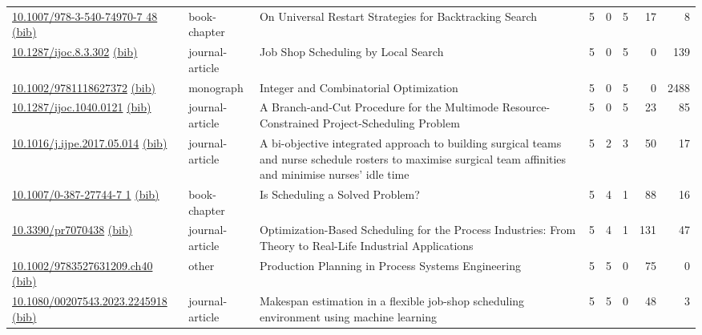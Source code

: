 {\begin{longtable}{p{5cm}lp{11cm}rrrrr}
\href{http://dx.doi.org/10.1007/978-3-540-74970-7_48}{10.1007/978-3-540-74970-7 48} \href{https://www.doi2bib.org/bib/10.1007/978-3-540-74970-7_48}{(bib)} & book-chapter & On Universal Restart Strategies for Backtracking Search & 5 & 0 & 5 & 17 & 8 \\
\href{http://dx.doi.org/10.1287/ijoc.8.3.302}{10.1287/ijoc.8.3.302} \href{https://www.doi2bib.org/bib/10.1287/ijoc.8.3.302}{(bib)} & journal-article & Job Shop Scheduling by Local Search & 5 & 0 & 5 & 0 & 139 \\
\href{http://dx.doi.org/10.1002/9781118627372}{10.1002/9781118627372} \href{https://www.doi2bib.org/bib/10.1002/9781118627372}{(bib)} & monograph & Integer and Combinatorial Optimization & 5 & 0 & 5 & 0 & 2488 \\
\href{http://dx.doi.org/10.1287/ijoc.1040.0121}{10.1287/ijoc.1040.0121} \href{https://www.doi2bib.org/bib/10.1287/ijoc.1040.0121}{(bib)} & journal-article & A Branch-and-Cut Procedure for the Multimode Resource-Constrained Project-Scheduling Problem & 5 & 0 & 5 & 23 & 85 \\
\href{http://dx.doi.org/10.1016/j.ijpe.2017.05.014}{10.1016/j.ijpe.2017.05.014} \href{https://www.doi2bib.org/bib/10.1016/j.ijpe.2017.05.014}{(bib)} & journal-article & A bi-objective integrated approach to building surgical teams and nurse schedule rosters to maximise surgical team affinities and minimise nurses' idle time & 5 & 2 & 3 & 50 & 17 \\
\href{http://dx.doi.org/10.1007/0-387-27744-7_1}{10.1007/0-387-27744-7 1} \href{https://www.doi2bib.org/bib/10.1007/0-387-27744-7_1}{(bib)} & book-chapter & Is Scheduling a Solved Problem? & 5 & 4 & 1 & 88 & 16 \\
\href{http://dx.doi.org/10.3390/pr7070438}{10.3390/pr7070438} \href{https://www.doi2bib.org/bib/10.3390/pr7070438}{(bib)} & journal-article & Optimization-Based Scheduling for the Process Industries: From Theory to Real-Life Industrial Applications & 5 & 4 & 1 & 131 & 47 \\
\href{http://dx.doi.org/10.1002/9783527631209.ch40}{10.1002/9783527631209.ch40} \href{https://www.doi2bib.org/bib/10.1002/9783527631209.ch40}{(bib)} & other & Production Planning in Process Systems Engineering & 5 & 5 & 0 & 75 & 0 \\
\href{http://dx.doi.org/10.1080/00207543.2023.2245918}{10.1080/00207543.2023.2245918} \href{https://www.doi2bib.org/bib/10.1080/00207543.2023.2245918}{(bib)} & journal-article & Makespan estimation in a flexible job-shop scheduling environment using machine learning & 5 & 5 & 0 & 48 & 3 \\

\end{longtable}}
